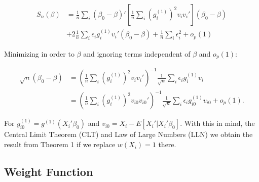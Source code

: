 \documentclass[a4paper]{article}
\begin{document}
\begin{align*}
S_{n}(\beta) & = \frac{1}{n}\sum_i (\beta_0 - \beta)'[\frac{1}{n}\sum_i (g_i^{(1)})^2v_iv_i'](\beta_0 - \beta) \\
             & + 2\frac{1}{n}\sum_i\epsilon_ig_i^{(1)}v_i'(\beta_0 - \beta) + \frac{1}{n}\sum_i \epsilon_i^2 + o_p(1)
\end{align*}

Minimizing in order to $\beta$ and ignoring terms independent of $\beta$ and $o_p(1)$:

\begin{align*}
\sqrt{n}(\beta_0 - \beta) & = (\frac{1}{n}\sum_i(g_{i}^{(1)})^2v_iv_i')^{-1}\frac{1}{\sqrt{n}}\sum_i\epsilon_i g_{i}^{(1)}v_i \\
     					  & = (\frac{1}{n}\sum_i(g_{i}^{(1)})^2v_{i0}v_{i0}')^{-1}\frac{1}{\sqrt{n}}\sum_i\epsilon_i g_{i0}^{(1)}v_{i0} + o_p(1).
\end{align*}

For $g_{i0}^{(1)} = g^{(1)}(X_i'\beta_0)$ and $v_{i0} = X_i - E[X_i'|X_i'\beta_0]$. With this in mind, the Central Limit Theorem (CLT) and Law of Large Numbers (LLN) we obtain the result from Theorem 1 if we replace $w(X_i) = 1$ there.














\subsection{Weight Function} %
\label{sub:Weight Function}
\end{document}
